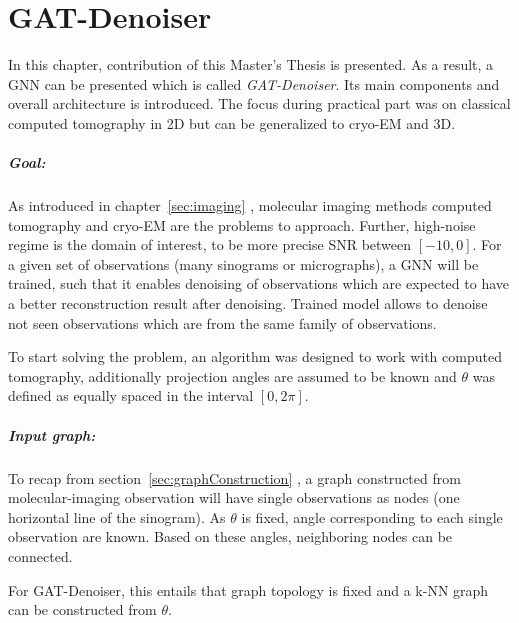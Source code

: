 \chapter{GAT-Denoiser}
\label{sec:contribution}

In this chapter, contribution of this Master's Thesis is presented.
As a result, a GNN can be presented which is called \textit{GAT-Denoiser}.
Its main components and overall architecture is introduced.
The focus during practical part was on classical computed tomography in 2D but
can be generalized to cryo-EM and 3D.

\paragraph{Goal:}
As introduced in chapter~\ref{sec:imaging} \textit{}, molecular imaging methods computed tomography and cryo-EM are the problems
to approach. Further, high-noise regime is the domain of interest, to be more precise SNR between $[-10, 0]$.
For a given set of observations (many sinograms or micrographs), a GNN will be trained, such that
it enables denoising of observations which are expected to have a better reconstruction result after denoising.
Trained model allows to denoise not seen observations which are from the same family of observations.


\begin{tcolorbox}[colback=red!5!white,colframe=red!75!black]
  To start solving the problem, an algorithm was designed to work with computed tomography, additionally
  projection angles are assumed to be known and $\theta$ was defined as equally spaced 
  in the interval $[0, 2 \pi]$. 
\end{tcolorbox}

\paragraph{Input graph:}
To recap from section~\ref{sec:graphConstruction}  \textit{}, 
a graph constructed from molecular-imaging observation will have single observations as nodes (one horizontal line of the sinogram). 
As $\theta$ is fixed, angle corresponding to each single observation are known. 
Based on these angles, neighboring nodes can be connected.

\begin{tcolorbox}[colback=red!5!white,colframe=red!75!black]
  For GAT-Denoiser, this entails that graph topology is fixed and
  a k-NN graph can be constructed from $\theta$.
\end{tcolorbox}


